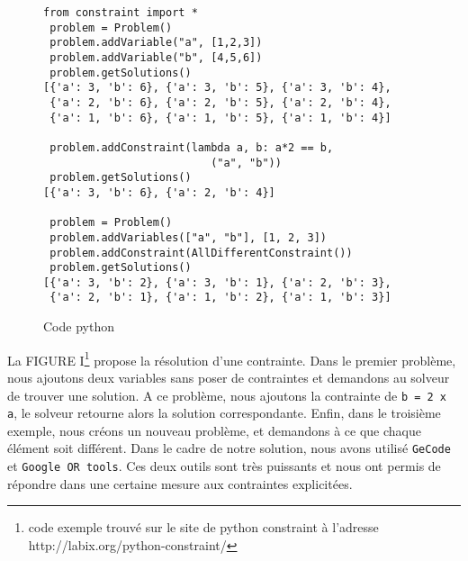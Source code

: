 \begin{figure}[!h]
\begin{lstlisting}[frame=single]
 from constraint import *
 problem = Problem()
 problem.addVariable("a", [1,2,3])
 problem.addVariable("b", [4,5,6])
 problem.getSolutions()
[{'a': 3, 'b': 6}, {'a': 3, 'b': 5}, {'a': 3, 'b': 4},
 {'a': 2, 'b': 6}, {'a': 2, 'b': 5}, {'a': 2, 'b': 4},
 {'a': 1, 'b': 6}, {'a': 1, 'b': 5}, {'a': 1, 'b': 4}]

 problem.addConstraint(lambda a, b: a*2 == b,
                          ("a", "b"))
 problem.getSolutions()
[{'a': 3, 'b': 6}, {'a': 2, 'b': 4}]

 problem = Problem()
 problem.addVariables(["a", "b"], [1, 2, 3])
 problem.addConstraint(AllDifferentConstraint())
 problem.getSolutions()
[{'a': 3, 'b': 2}, {'a': 3, 'b': 1}, {'a': 2, 'b': 3},
 {'a': 2, 'b': 1}, {'a': 1, 'b': 2}, {'a': 1, 'b': 3}]
\end{lstlisting}
\caption{Code python}
\end{figure}

La FIGURE I\footnote{code exemple trouvé sur le site de python constraint à l'adresse http://labix.org/python-constraint/} propose la résolution d'une contrainte. Dans le premier problème, nous ajoutons deux variables sans poser de contraintes et demandons au solveur de trouver une solution. A ce problème, nous ajoutons la contrainte de \texttt{b = 2 x a}, le solveur retourne alors la solution correspondante. Enfin, dans le troisième exemple, nous créons un nouveau problème, et demandons à ce que chaque élément soit différent.
\newline
\indent
Dans le cadre de notre solution, nous avons utilisé \texttt{GeCode} et \texttt{Google OR tools}. Ces deux outils sont très puissants et nous ont permis de répondre dans une certaine mesure aux contraintes explicitées.

